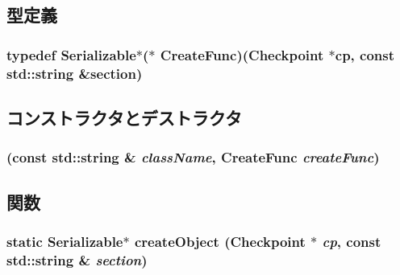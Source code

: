 \subsection{型定義}
\hypertarget{classSerializableClass_a4380a9efd91eaed365bb34416792b6b3}{
\subsubsection[{CreateFunc}]{\setlength{\rightskip}{0pt plus 5cm}typedef {\bf Serializable}$\ast$($\ast$ {\bf CreateFunc})({\bf Checkpoint} $\ast$cp, const std::string \&section)}}
\label{classSerializableClass_a4380a9efd91eaed365bb34416792b6b3}


\subsection{コンストラクタとデストラクタ}
\hypertarget{classSerializableClass_a3b694007e46d2f4fe651c5b2572d5595}{
\subsubsection[{SerializableClass}]{ (const std::string \& {\em className}, \/  {\bf CreateFunc} {\em createFunc})}}
\label{classSerializableClass_a3b694007e46d2f4fe651c5b2572d5595}


\subsection{関数}
\hypertarget{classSerializableClass_a5eff49a2a3d98b8edff0de1193dc231c}{
\subsubsection[{createObject}]{\setlength{\rightskip}{0pt plus 5cm}static {\bf Serializable}$\ast$ createObject ({\bf Checkpoint} $\ast$ {\em cp}, \/  const std::string \& {\em section})}}
\label{classSerializableClass_a5eff49a2a3d98b8edff0de1193dc231c}


